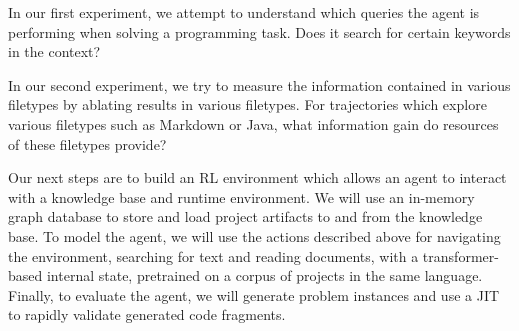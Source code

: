 \documentclass[11pt]{article}
\begin{document}
In our first experiment, we attempt to understand which queries the agent is performing when solving a programming task. Does it search for certain keywords in the context?

In our second experiment, we try to measure the information contained in various filetypes by ablating results in various filetypes. For trajectories which explore various filetypes such as Markdown or Java, what information gain do resources of these filetypes provide?

Our next steps are to build an RL environment which allows an agent to interact with a knowledge base and runtime environment. We will use an in-memory graph database to store and load project artifacts to and from the knowledge base. To model the agent, we will use the actions described above for navigating the environment, searching for text and reading documents, with a transformer-based internal state, pretrained on a corpus of projects in the same language. Finally, to evaluate the agent, we will generate problem instances and use a JIT to rapidly validate generated code fragments.

  
  
\end{document}
